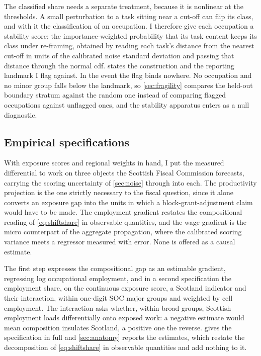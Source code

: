 The classified share needs a separate treatment, because it is nonlinear at the thresholds. A small perturbation to a task sitting near a cut-off can flip its class, and with it the classification of an occupation. I therefore give each occupation a stability score: the importance-weighted probability that its task content keeps its class under re-framing, obtained by reading each task's distance from the nearest cut-off in units of the calibrated noise standard deviation and passing that distance through the normal cdf.  states the construction and the reporting landmark I flag against. 
In the event the flag binds nowhere. No occupation and no minor group falls below the landmark, so \cref{sec:fragility} compares the held-out boundary stratum against the random one instead of comparing flagged occupations against unflagged ones, and the stability apparatus enters as a null diagnostic.

\subsection{Empirical specifications}\label{sec:specs}

With exposure scores and regional weights in hand, I put the measured differential to work on three objects the Scottish Fiscal Commission forecasts, carrying the scoring uncertainty of \cref{sec:noise} through into each. The productivity projection is the one strictly necessary to the fiscal question, since it alone converts an exposure gap into the units in which a block-grant-adjustment claim would have to be made. The employment gradient restates the compositional reading of \cref{eq:shiftshare} in observable quantities, and the wage gradient is the micro counterpart of the aggregate propagation, where the calibrated scoring variance meets a regressor measured with error. None is offered as a causal estimate.

The first step expresses the compositional gap as an estimable gradient, regressing log occupational employment, and in a second specification the employment share, on the continuous exposure score, a Scotland indicator and their interaction, within one-digit SOC major groups and weighted by cell employment. The interaction asks whether, within broad groups, Scottish employment loads differentially onto exposed work: a negative estimate would mean composition insulates Scotland, a positive one the reverse.  gives the specification in full and \cref{sec:anatomy} reports the estimates, which restate the decomposition of \cref{eq:shiftshare} in observable quantities and add nothing to it.

